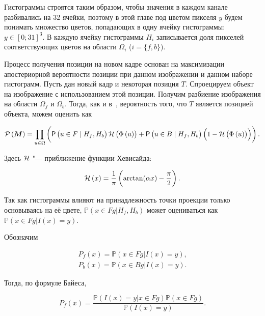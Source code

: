 Гистограммы строятся таким образом, чтобы значения в каждом канале разбивались
на 32 ячейки, поэтому в этой главе под цветом пикселя $y$ будем понимать
множество цветов, попадающих в одну ячейку гистограммы: $y \in [0; 31]^3$.
В каждую ячейку гистограммы $H_i$ записывается доля пикселей соответствующих
цветов на области $\Omega_i$ ($i = \{f, b\}$).

Процесс получения позиции на новом кадре основан на максимизации апостериорной
вероятности позиции при данном изображении и данном наборе гистограмм.
Пусть дан новый кадр и некоторая позиция $T$.
Спроецируем объект на изображение с использованием этой позиции.
Получим разбиение изображения на области $\Omega_f$ и $\Omega_b$.
Тогда, как и в~\cite{Hexner2016}, вероятность того, что $T$ является позицией
объекта, можем оценить как

\newcommand{\Hf}{\ensuremath{H_f}}
\newcommand{\Hb}{\ensuremath{H_b}}
\newcommand{\uvec}{\ensuremath{\vect{u}}}
\newcommand{\hedist}{\ensuremath{\HeX{\CDistX{\uvec}}}}

\begin{equation}
\label{eqn:pos_prob}
    \probMainX{\Pose} = \prod\limits_{\uvec \in \ImgDom} \left(
        \probX{\uvec \in \FgTrue \mid \Hf, \Hb} \hedist
        + \probX{\uvec \in \BgTrue \mid \Hf, \Hb} \left( 1 - \hedist \right)
    \right)
\text{.}
\end{equation}

Здесь $\mathcal{H}$ "--- приближение функции Хевисайда:

\begin{equation}
\label{eqn:heaviside}
    \mathcal{H} \left( x \right) = \frac{1}{\pi} \left( \arctan(\alpha x) - \frac{\pi}{2} \right)
\text{.}
\end{equation}

Так как гистограммы влияют на принадлежность точки проекции только основываясь
на её цвете,
$\mathbb{P}(x \in Fg | H_f, H_b)$
может оцениваться как
$\mathbb{P}(x \in Fg | I(x) = y)$.

Обозначим

\begin{equation}
\label{eqn:Pfx}
\begin{array}{c}
P_f(x) = \mathbb{P}(x \in Fg | I(x) = y) \text{,} \\
P_b(x) = \mathbb{P}(x \in Bg | I(x) = y) \text{.}
\end{array}
\end{equation}

Тогда, по формуле Байеса,

\begin{equation}
\label{eqn:Bayes}
P_f(x)= \frac{\mathbb{P}(I(x) = y | x \in Fg) 
\mathbb{P}(x \in Fg)}{\mathbb{P}(I(x) = y)}
\text{.}
\end{equation}

